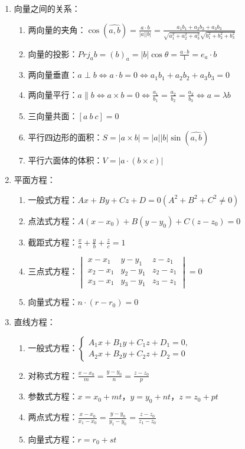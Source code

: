 \documentclass[UTF8]{ctexart}
\theoremstyle{remark}
\begin{document}
\begin{enumerate}
\item 向量之间的关系：
\begin{enumerate}
	\item 两向量的夹角：\(\cos(\hat{a,b})=\frac{a\cdot b}{|a||b|}=\frac{a_{1}b_{1}+a_{2}b_{2}+a_{3}b_{3}}{\sqrt{a_{1}^{2}+a_{2}^{2}+a_{3}^{2}}\sqrt{b_{1}^{2}+b_{2}^{2}+b_{3}^{2}}}\)
	\item 向量的投影：\(Prj_{a}b=(b)_{a}=|b|\cos\theta=\frac{a\cdot b}{1}=e_{a}\cdot b\)
	\item 两向量垂直：\(a\perp b\Leftrightarrow a\cdot b=0\Leftrightarrow a_{1}b_{1}+a_{2}b_{2}+a_{3}b_{3}=0\)
	\item 两向量平行：\(a\parallel b\Leftrightarrow a\times b=0\Leftrightarrow\frac{a_{1}}{b_{1}}=\frac{a_{2}}{b_{2}}=\frac{a_{3}}{b_{3}}\Leftrightarrow a=\lambda b\)
	\item 三向量共面：\([a\ b\ c]=0\)
	\item 平行四边形的面积：\(S=|a\times b|=|a||b|\sin(\widehat{a,b})\)
	\item 平行六面体的体积：\(V=|a\cdot(b\times c)|\)
\end{enumerate}

\item 平面方程：
\begin{enumerate}
	\item 一般式方程：\(Ax+By+Cz+D=0(A^{2}+B^{2}+C^{2}\neq0)\)
	\item 点法式方程：\(A(x-x_{0})+B(y-y_{0})+C(z-z_{0})=0\)
	\item 截距式方程：\(\frac{x}{a}+\frac{y}{b}+\frac{z}{c}=1\)
	\item 三点式方程：\(\begin{vmatrix}
		x-x_{1} & y-y_{1} & z-z_{1} \\
		x_{2}-x_{1} & y_{2}-y_{1} & z_{2}-z_{1} \\
		x_{3}-x_{1} & y_{3}-y_{1} & z_{3}-z_{1}
	\end{vmatrix}=0\)
	\item 向量式方程：\(n\cdot(r-r_{0})=0\)
\end{enumerate}

\item 直线方程：
\begin{enumerate}
	\item 一般式方程：\(\begin{cases}
		A_{1}x+B_{1}y+C_{1}z+D_{1}=0, \\
		A_{2}x+B_{2}y+C_{2}z+D_{2}=0
	\end{cases}\)
	\item 对称式方程：\(\frac{x-x_{0}}{m}=\frac{y-y_{0}}{n}=\frac{z-z_{0}}{p}\)
	\item 参数式方程：\(x=x_{0}+mt\)，\(y=y_{0}+nt\)，\(z=z_{0}+pt\)
	\item 两点式方程：\(\frac{x-x_{0}}{x_{1}-x_{0}}=\frac{y-y_{0}}{y_{1}-y_{0}}=\frac{z-z_{0}}{z_{1}-z_{0}}\)
	\item 向量式方程：\(r=r_{0}+st\)
\end{enumerate}


\end{enumerate}
\end{document}
